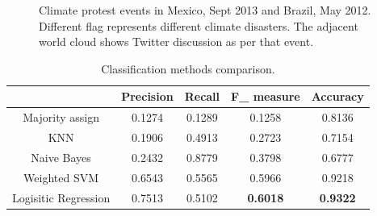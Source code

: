 \documentclass[9pt,twocolumn,twoside]{pnas-new}
\begin{document}
\begin{figure}[ht]
	\centering
	\caption{Climate protest events in Mexico, Sept 2013 and Brazil, May 2012. Different flag represents different climate disasters. The adjacent world cloud shows Twitter discussion as per that event. }
\label{Twitter-events}
\end{figure}



\begin{table}[!ht]
\small
\caption{Classification methods comparison.}
\vspace{0.5em}
\centering
\begin{tabular}{|c | c | c | c | c |}
\hline
 & \textbf{Precision} & \textbf{Recall} & \textbf{F\_ measure} & \textbf{Accuracy}  \\ [1ex]
\hline
Majority assign   &  0.1274  &  0.1289 &  0.1258 &  0.8136  \\[1ex]
\hline
KNN &  0.1906  & 0.4913 &  0.2723 &  0.7154  \\[1ex]
\hline
Naive Bayes &  0.2432 & 0.8779 &  0.3798 &  0.6777  \\[1ex]
\hline
Weighted SVM &  0.6543 &  0.5565 & 0.5966 &  0.9218  \\[1ex]
\hline
Logisitic Regression & 0.7513 &  0.5102 &  \textbf{0.6018}&  \textbf{0.9322}  \\[1ex]
\hline
\end{tabular}
\label{table:comparision}
\end{table}
\end{document}
